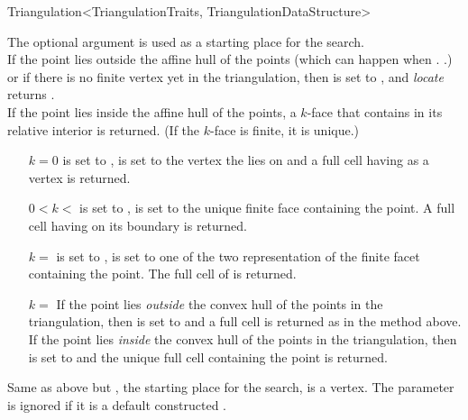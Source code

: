 \begin{ccRefClass}{Triangulation<TriangulationTraits, TriangulationDataStructure>}
{The optional argument  is used as a starting place for the
search.\\ If the  point lies outside the affine hull of the points
(which can happen when \ccVar.
\ccVar.) or if there is no finite vertex yet in the
triangulation, then  is set to
, and \textit{locate} returns
.\\ If the  point lies inside the affine hull
of the points, a $k$-face that contains  {in its relative
interior} is returned. (If the $k$-face is finite, it is
unique.)\begin{itemize} \item[$k=0$]  is set to ,
 is set to the vertex  the  lies on and a full cell
having  as a vertex is returned.
\item[$0<k<$\ccc{c.current_dimension()-1}]  is set to
,  is set to the unique finite face containing the
 point. A full cell having  on its boundary is returned.
\item[$k=$\ccc{c.current_dimension()-1}]  is set to
,  is set to one of the two representation of
the finite facet containing the
 point. The full cell of  is returned.
\item[$k=$\ccc{c.current_dimension()}] If the  point lies
{\em outside} the convex hull of the points in the triangulation, then
 is set to  and a full cell is returned
as in the  method above. If the  point lies
{\em inside} the convex hull of the points in the triangulation, then
 is set to  and the unique full cell containing
the  point is returned. \end{itemize}}

{Same as above but , the starting place for the search, is a vertex.
The parameter  is ignored if it is a default constructed
.}



\end{ccRefClass}
